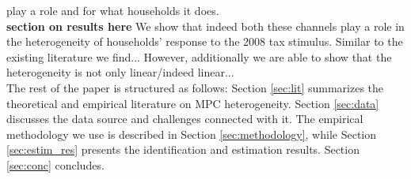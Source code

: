 play a role and for what households it does. \\ 
\textbf{section on results here}
We show that indeed both these channels play a role in the heterogeneity of households' response to the 2008 tax stimulus. Similar to the existing literature we find... However, additionally we are able to show that the heterogeneity is not only linear/indeed linear... \\ 
The rest of the paper is structured as follows: Section \ref{sec:lit} summarizes the theoretical and empirical literature on MPC heterogeneity. Section \ref{sec:data} discusses the data source and challenges connected with it. The empirical methodology we use is described in Section \ref{sec:methodology}, while Section \ref{sec:estim_res} presents the identification and estimation results. Section \ref{sec:conc} concludes.